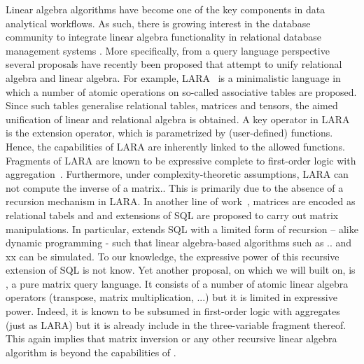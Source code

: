 
%
Linear algebra algorithms have become one of the key components in data analytical workflows. As such, there is growing interest in the database community to integrate linear algebra functionality in relational database management systems \cite{}. More specifically, from a query language perspective several proposals have recently been proposed that attempt to unify relational algebra and linear algebra. For example, LARA~\cite{} is a minimalistic language in which a number of atomic operations on so-called associative tables are proposed. Since such tables generalise relational tables, matrices and tensors, the aimed unification of linear and relational algebra is obtained. A key operator in LARA is the extension operator, which is parametrized by (user-defined) functions. Hence, the capabilities of LARA are inherently linked to the allowed functions. Fragments of LARA are known to be expressive complete to first-order logic with aggregation~\cite{}. Furthermore, under complexity-theoretic assumptions, LARA can not compute the inverse of a matrix.\cite{}. This is primarily due to the absence of a recursion mechanism in LARA. In another line of work~\cite{}, matrices are encoded as relational tabels and and extensions of SQL are proposed to carry out matrix manipulations. In particular, \cite{} extends SQL with a limited form of recursion -- alike dynamic programming - such that linear algebra-based algorithms such as .. and xx can be simulated. To our knowledge, the expressive power of this recursive extension of SQL is not know. Yet another proposal, on which we will built on, is \lang, a pure matrix query language. It consists of a number of atomic linear algebra operators (transpose, matrix multiplication, ...) but it is limited in expressive power. Indeed, it is known to be subsumed in first-order logic with aggregates (just as LARA) but it is already include in the three-variable fragment thereof. This again implies that matrix inversion or any other recursive linear algebra algorithm is beyond the capabilities of \lang.

